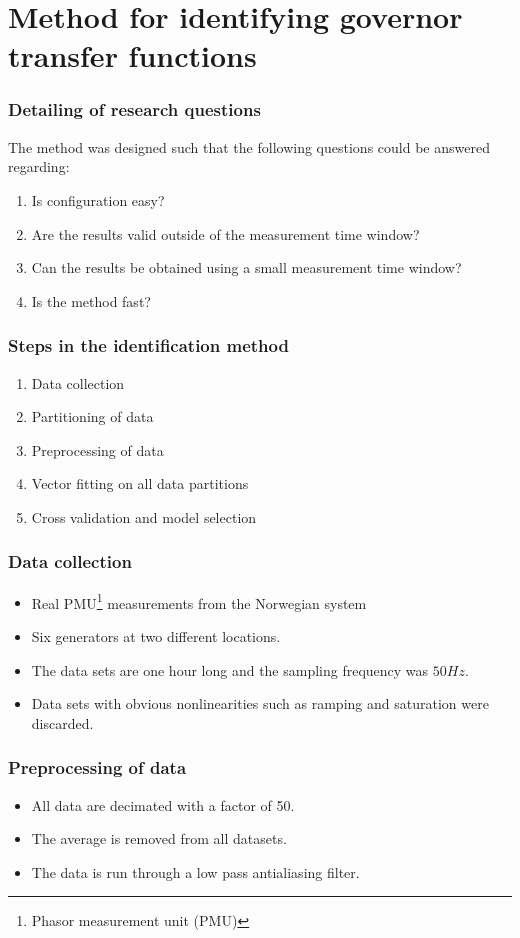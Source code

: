\section[Method]{Method for identifying governor transfer functions}
\begin{frame}
	\frametitle{Detailing of research questions}
	The method was designed such that the following questions could be answered regarding:
	\begin{enumerate}
		\item<1-> Is configuration easy?
		\item<2-> Are the results valid outside of the measurement time window?
		\item<3-> Can the results be obtained using a small measurement time window?
		\item<4-> Is the method fast?
	\end{enumerate}
\end{frame}
\begin{frame}
	\frametitle{Steps in the identification method}
	\begin{enumerate}
			\item<1-> Data collection
			\item<2-> Partitioning of data
			\item<3-> Preprocessing of data
			\item<4-> Vector fitting on all data partitions
			\item<4-> Cross validation and model selection
	\end{enumerate}
\end{frame}
\begin{frame}
	\frametitle{Data collection}
	\begin{itemize}
		\item<1-> Real PMU\footnote{Phasor measurement unit (PMU)} measurements from the Norwegian system
		\item<2-> Six generators at two different locations. 
		\item<3-> The data sets are one hour long and the sampling frequency was $50Hz$.
		\item<4-> Data sets with obvious nonlinearities such as ramping and saturation were discarded.
	\end{itemize}
\end{frame}
\begin{frame}
	\frametitle{Preprocessing of data}
	\begin{itemize}
		\item<1-> All data are decimated with a factor of 50.
		\item<2-> The average is removed from all datasets.
		\item<3-> The data is run through a low pass antialiasing filter.
		\end{itemize}
\end{frame}
